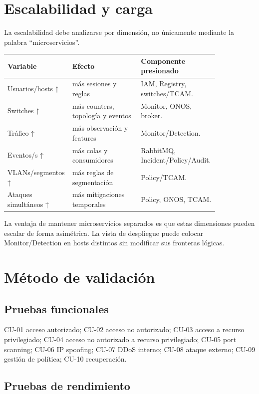 \documentclass[11pt,a4paper]{article}
\begin{document}
\section{Escalabilidad y carga}

La escalabilidad debe analizarse por dimensión, no únicamente mediante la palabra ``microservicios''.

\begin{longtable}{p{0.2\linewidth}p{0.32\linewidth}p{0.32\linewidth}}
\toprule
Variable & Efecto & Componente presionado\\
\midrule
Usuarios/hosts ↑ & más sesiones y reglas & IAM, Registry, switches/TCAM.\\
Switches ↑ & más counters, topología y eventos & Monitor, ONOS, broker.\\
Tráfico ↑ & más observación y features & Monitor/Detection.\\
Eventos/s ↑ & más colas y consumidores & RabbitMQ, Incident/Policy/Audit.\\
VLANs/segmentos ↑ & más reglas de segmentación & Policy/TCAM.\\
Ataques simultáneos ↑ & más mitigaciones temporales & Policy, ONOS, TCAM.\\
\bottomrule
\end{longtable}

La ventaja de mantener microservicios separados es que estas dimensiones pueden escalar de forma asimétrica. La vista de despliegue puede colocar Monitor/Detection en hosts distintos sin modificar sus fronteras lógicas.

\section{Método de validación}

\subsection{Pruebas funcionales}

CU-01 acceso autorizado; CU-02 acceso no autorizado; CU-03 acceso a recurso privilegiado; CU-04 acceso no autorizado a recurso privilegiado; CU-05 port scanning; CU-06 IP spoofing; CU-07 DDoS interno; CU-08 ataque externo; CU-09 gestión de política; CU-10 recuperación.

\subsection{Pruebas de rendimiento}
\end{document}
